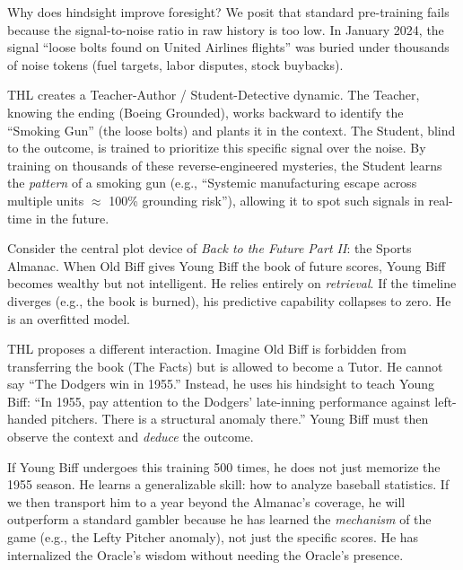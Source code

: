 \documentclass[11pt,a4paper]{article}
\begin{document}
Why does hindsight improve foresight? We posit that standard pre-training fails because the signal-to-noise ratio in raw history is too low. In January 2024, the signal ``loose bolts found on United Airlines flights'' was buried under thousands of noise tokens (fuel targets, labor disputes, stock buybacks).

THL creates a Teacher-Author / Student-Detective dynamic. The Teacher, knowing the ending (Boeing Grounded), works backward to identify the ``Smoking Gun'' (the loose bolts) and plants it in the context. The Student, blind to the outcome, is trained to prioritize this specific signal over the noise. By training on thousands of these reverse-engineered mysteries, the Student learns the \textit{pattern} of a smoking gun (e.g., ``Systemic manufacturing escape across multiple units $\approx$ 100\% grounding risk''), allowing it to spot such signals in real-time in the future.

Consider the central plot device of \textit{Back to the Future Part II}: the Sports Almanac. When Old Biff gives Young Biff the book of future scores, Young Biff becomes wealthy but not intelligent. He relies entirely on \textit{retrieval}. If the timeline diverges (e.g., the book is burned), his predictive capability collapses to zero. He is an overfitted model.

THL proposes a different interaction. Imagine Old Biff is forbidden from transferring the book (The Facts) but is allowed to become a Tutor. He cannot say ``The Dodgers win in 1955.'' Instead, he uses his hindsight to teach Young Biff: ``In 1955, pay attention to the Dodgers' late-inning performance against left-handed pitchers. There is a structural anomaly there.'' Young Biff must then observe the context and \textit{deduce} the outcome.

If Young Biff undergoes this training 500 times, he does not just memorize the 1955 season. He learns a generalizable skill: how to analyze baseball statistics. If we then transport him to a year beyond the Almanac's coverage, he will outperform a standard gambler because he has learned the \textit{mechanism} of the game (e.g., the Lefty Pitcher anomaly), not just the specific scores. He has internalized the Oracle's wisdom without needing the Oracle's presence.
\end{document}
